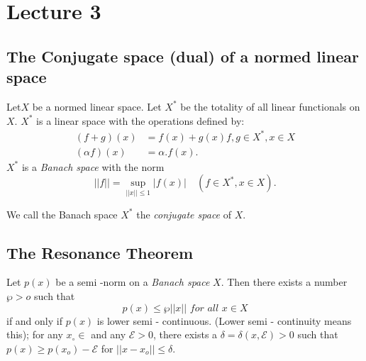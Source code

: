\chapter{Lecture 3}\label{chap3} %

\section{The Conjugate space (dual) of a normed linear space}\label{chap3:sec1}

Let\pageoriginale $X$ be a normed linear space. Let $X^*$ be the totality of all
linear functionals on $X$. $X^*$ is a linear space with the operations
defined by:
\begin{align*}
 (f + g ) (x) &= f(x) + g(x) f, g \in X^*, x \in X\\
 (\alpha f )(x) & = \alpha. f(x). 
\end{align*}
$X^*$ is a \textit{ Banach space} with the norm 
$$
||f || = \sup_{ ||x||\leq 1} |f(x)| \quad (f \in X^*, x \in X). 
$$

We call the Banach space $X^*$ the \textit{ conjugate space } of $X$. 

\section{The Resonance Theorem}\label{chap3:sec2}

\begin{lemma*}[Gelfand ]
 Let $p(x)$ be a semi -norm on a \textit{ Banach space }$X$. Then
 there exists a number $\wp > o $ such that 
 $$
 p(x) \leq \wp ||x || \textit { for all } x \in X
 $$
 if and only if $p(x)$ is lower semi - continuous. (Lower semi -
 continuity means this); for any $x_\circ \in $ and any
 $\mathcal{E} > 0$, there exists a $\delta = \delta (x, \mathcal{E} )
 > 0$ such that $p(x) \geq p(x_o) - \mathcal{E} $ for $||x - x_o
 || \leq \delta$. 
\end{lemma*}

